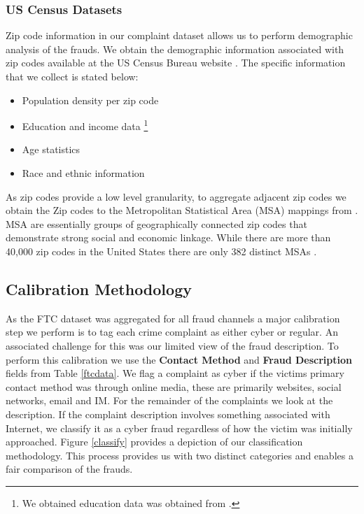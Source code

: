 \documentclass[conference]{IEEEtran}
\begin{document}
\subsubsection{US Census Datasets}
Zip code information in our complaint dataset allows us to perform demographic analysis of the frauds. We obtain the demographic information associated with zip codes available at the US Census Bureau website \cite{uscensus}. The specific information that we collect is stated below:

\begin{itemize}
\vspace{8pt}
  \item Population density per zip code
  \item Education and income data \footnote{We obtained education data was obtained from \cite{zipatlas}.}
  \item Age statistics
  \item Race and ethnic information
  \vspace{8pt}
\end{itemize}

As zip codes provide a low level granularity, to aggregate adjacent zip codes we obtain the Zip codes to the Metropolitan Statistical Area (MSA) mappings from \cite{uslaborstats}. MSA are essentially groups of geographically connected zip codes that demonstrate strong social and economic linkage. While there are more than 40,000 zip codes in the United States there are only 382 distinct MSAs \cite{uscensus}.

\subsection{Calibration Methodology}

As the FTC dataset was aggregated for all fraud channels a major calibration step we perform is to tag each crime complaint as either cyber or regular. An associated challenge for this was our limited view of the fraud description. To perform this calibration we use the \textbf{Contact Method} and \textbf{Fraud Description} fields from Table \ref{ftcdata}. We flag a complaint as cyber if the victims primary contact method was through online media, these are primarily websites, social networks, email and IM. For the remainder of the complaints we look at the description. If the complaint description involves something associated with Internet, we classify it as a cyber fraud regardless of how the victim was initially approached. Figure \ref{classify} provides a depiction of our classification methodology. This process  provides us with two distinct categories  and enables a fair comparison of the frauds. 
     
\end{document}
